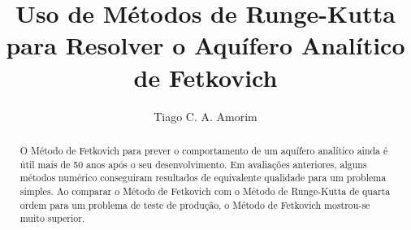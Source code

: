 \documentclass[final,5p]{elsarticle}
\numberwithin{equation}{section}
\begin{document}
\begin{frontmatter}



\title{Uso de Métodos de Runge-Kutta para Resolver o Aquífero Analítico de Fetkovich}


\author{Tiago C. A. Amorim}

\begin{abstract}

    O Método de Fetkovich para prever o comportamento de um aquífero analítico ainda é útil mais de 50 anos após o seu desenvolvimento. Em avaliações anteriores, alguns métodos numérico conseguiram resultados de equivalente qualidade para um problema simples. Ao comparar o Método de Fetkovich com o Método de Runge-Kutta de quarta ordem para um problema de teste de produção, o Método de Fetkovich mostrou-se muito superior.


\end{abstract}
\end{frontmatter}
\end{document}

